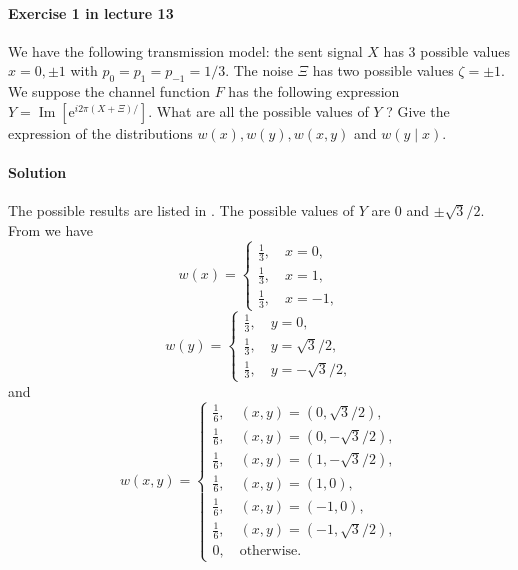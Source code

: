 \documentclass[hyperref, a4paper]{article}
\begin{document}
\paragraph{Exercise 1 in lecture 13} We have the following transmission model: the sent signal $X$ has 3 possible values $x=0, \pm 1$ with $p_0=p_1=p_{-1}=1 / 3$. The noise $\Xi$ has two possible values $\zeta=\pm 1$. We suppose the channel function $F$ has the following expression $Y=\operatorname{Im}\left[\mathrm{e}^{i 2 \pi(X+\Xi) / }\right]$. What are all the possible values of $Y$ ? Give the expression of the distributions $w(x), w(y), w(x, y)$ and $w(y \mid x)$.

\paragraph{Solution} The possible results are listed in .
The possible values of $Y$ are $0$ and $\pm \sqrt{3}/ 2$.
From  we have
\begin{equation}
    w(x) = \begin{cases}
        \frac{1}{3}, \quad x = 0, \\
        \frac{1}{3}, \quad x = 1, \\
        \frac{1}{3}, \quad x = -1,
    \end{cases}
\end{equation}
\begin{equation}
    w(y) = \begin{cases}
        \frac{1}{3}, \quad y = 0, \\
        \frac{1}{3}, \quad y = \sqrt{3} / 2, \\
        \frac{1}{3}, \quad y = - \sqrt{3} / 2,
    \end{cases}
\end{equation}
and 
\begin{equation}
    w(x , y) = \begin{cases}
        \frac{1}{6}, \quad (x, y) = (0, \sqrt{3} /2), \\
        \frac{1}{6}, \quad (x, y) = (0, - \sqrt{3} / 2), \\
        \frac{1}{6}, \quad (x, y) = (1, - \sqrt{3} / 2), \\
        \frac{1}{6}, \quad (x, y) = (1, 0), \\
        \frac{1}{6}, \quad (x, y) = (-1, 0), \\
        \frac{1}{6}, \quad (x, y) = (-1, \sqrt{3}/2), \\
        0, \quad \text{otherwise}.
    \end{cases}
\end{equation}
\end{document}

